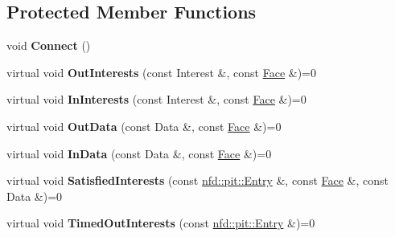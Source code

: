 \subsection*{Protected Member Functions}
\begin{DoxyCompactItemize}
\item 
void {\bfseries Connect} ()\hypertarget{classns3_1_1ndn_1_1L3Tracer_a1928711226e3c3c291f53b5c2990c428}{}\label{classns3_1_1ndn_1_1L3Tracer_a1928711226e3c3c291f53b5c2990c428}

\item 
virtual void {\bfseries Out\+Interests} (const Interest \&, const \hyperlink{classnfd_1_1Face}{Face} \&)=0\hypertarget{classns3_1_1ndn_1_1L3Tracer_a4d2328f207aca793454fb16738c33729}{}\label{classns3_1_1ndn_1_1L3Tracer_a4d2328f207aca793454fb16738c33729}

\item 
virtual void {\bfseries In\+Interests} (const Interest \&, const \hyperlink{classnfd_1_1Face}{Face} \&)=0\hypertarget{classns3_1_1ndn_1_1L3Tracer_a16b08d425d08a491191b21057d0098ec}{}\label{classns3_1_1ndn_1_1L3Tracer_a16b08d425d08a491191b21057d0098ec}

\item 
virtual void {\bfseries Out\+Data} (const Data \&, const \hyperlink{classnfd_1_1Face}{Face} \&)=0\hypertarget{classns3_1_1ndn_1_1L3Tracer_aa9074ef51a4cff7accfee90b3196f244}{}\label{classns3_1_1ndn_1_1L3Tracer_aa9074ef51a4cff7accfee90b3196f244}

\item 
virtual void {\bfseries In\+Data} (const Data \&, const \hyperlink{classnfd_1_1Face}{Face} \&)=0\hypertarget{classns3_1_1ndn_1_1L3Tracer_ab241eba244a10c74e39991a6939dae8f}{}\label{classns3_1_1ndn_1_1L3Tracer_ab241eba244a10c74e39991a6939dae8f}

\item 
virtual void {\bfseries Satisfied\+Interests} (const \hyperlink{classnfd_1_1pit_1_1Entry}{nfd\+::pit\+::\+Entry} \&, const \hyperlink{classnfd_1_1Face}{Face} \&, const Data \&)=0\hypertarget{classns3_1_1ndn_1_1L3Tracer_a5b5c708f9758affdb81c206707de56e2}{}\label{classns3_1_1ndn_1_1L3Tracer_a5b5c708f9758affdb81c206707de56e2}

\item 
virtual void {\bfseries Timed\+Out\+Interests} (const \hyperlink{classnfd_1_1pit_1_1Entry}{nfd\+::pit\+::\+Entry} \&)=0\hypertarget{classns3_1_1ndn_1_1L3Tracer_a943139a4f75a212fef33b438e17babf9}{}\label{classns3_1_1ndn_1_1L3Tracer_a943139a4f75a212fef33b438e17babf9}

\end{DoxyCompactItemize}
